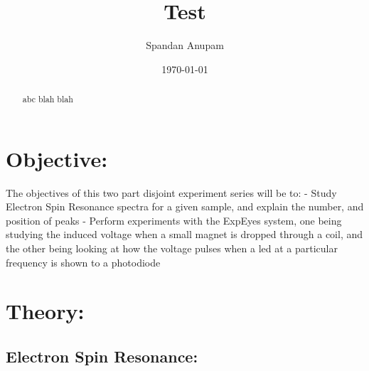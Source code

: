 \documentclass{../_layouts/ieeeconf}
\begin{document}
\title{Test}

\author{Spandan Anupam}

\date{\today}
\maketitle

\begin{abstract}
abc blah blah

\end{abstract}
\section{Objective:}
The objectives of this two part disjoint experiment series will be to: -
Study Electron Spin Resonance spectra for a given sample, and explain
the number, and position of peaks - Perform experiments with the ExpEyes
system, one being studying the induced voltage when a small magnet is
dropped through a coil, and the other being looking at how the voltage
pulses when a led at a particular frequency is shown to a photodiode

\section{Theory:}
\hypertarget{electron-spin-resonance}{%
\subsection{Electron Spin Resonance:}\label{electron-spin-resonance}}
\end{document}
